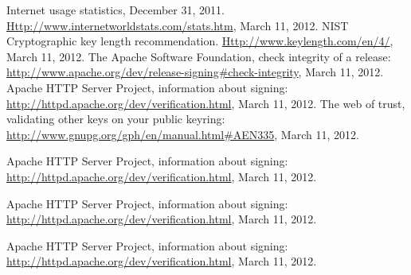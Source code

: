 \documentclass[a4paper, 12pt]{article}
\begin{document}
\begin{thebibliography}{10}
 Internet usage statistics, December 31, 2011. \url{Http://www.internetworldstats.com/stats.htm}, March 11, 2012.
 NIST Cryptographic key length recommendation. \url{Http://www.keylength.com/en/4/}, March 11, 2012.
 The Apache Software Foundation, check integrity of a release: \url{http://www.apache.org/dev/release-signing\#check-integrity}, March 11, 2012.
Apache HTTP Server Project, information about signing: \url{http://httpd.apache.org/dev/verification.html}, March 11, 2012.
The web of trust, validating other keys on your public keyring: \url{http://www.gnupg.org/gph/en/manual.html#AEN335}, March 11, 2012.

Apache HTTP Server Project, information about signing: \url{http://httpd.apache.org/dev/verification.html}, March 11, 2012.

Apache HTTP Server Project, information about signing: \url{http://httpd.apache.org/dev/verification.html}, March 11, 2012.

Apache HTTP Server Project, information about signing: \url{http://httpd.apache.org/dev/verification.html}, March 11, 2012.
\end{thebibliography}
\end{document}
